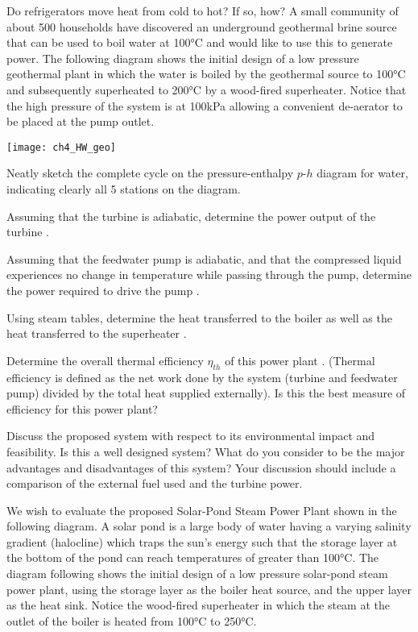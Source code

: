 \begin{homework}
  \question Do refrigerators move heat from cold to hot? If so, how?
  \newpage
  \question A small community of about 500 households have discovered an underground geothermal brine source that can be used to boil water at 100°C and would like to use this to generate power. The following diagram shows the initial design of a low pressure geothermal plant in which the water is boiled by the geothermal source to 100°C and subsequently superheated to 200°C by a wood-fired superheater. Notice that the high pressure of the system is at 100kPa allowing a convenient de-aerator to be placed at the pump outlet.
  \begin{center}
    \texttt{[image: ch4\_HW\_geo]}
  \end{center}
  \begin{questionparts}
  \item Neatly sketch the complete cycle on the pressure-enthalpy $p$-$h$ diagram for water, indicating clearly all 5 stations on the diagram.
  \item Assuming that the turbine is adiabatic, determine the power output of the turbine \answer{[729kW]}.
  \item Assuming that the feedwater pump is adiabatic, and that the compressed liquid experiences no change in temperature while passing through the pump, determine the power required to drive the pump \answer{ [0.23kW]}.
  \item Using steam tables, determine the heat transferred to the boiler \answer{ [6271kW]} as well as the heat transferred to the superheater \answer{ [500kW]}.
  \item Determine the overall thermal efficiency $\eta_{th}$ of this power plant \answer{ [11\%]}. (Thermal efficiency is defined as the net work done by the system (turbine and feedwater pump) divided by the total heat supplied externally).  Is this the best measure of efficiency for this power plant?
  \item Discuss the proposed system with respect to its environmental impact and feasibility. Is this a well designed system? What do you consider to be the major advantages and disadvantages of this system? Your discussion should include a comparison of the external fuel used and the turbine power.
  \end{questionparts}
\newpage
  \question We wish to evaluate the proposed Solar-Pond Steam Power Plant shown in the following diagram. A solar pond is a large body of water having a varying salinity gradient (halocline) which traps the sun's energy such that the storage layer at the bottom of the pond can reach temperatures of greater than 100°C. The diagram following shows the initial design of a low pressure solar-pond steam power plant, using the storage layer as the boiler heat source, and the upper layer as the heat sink. Notice the wood-fired superheater in which the steam at the outlet of the boiler is heated from 100°C to 250°C.

\end{homework}
